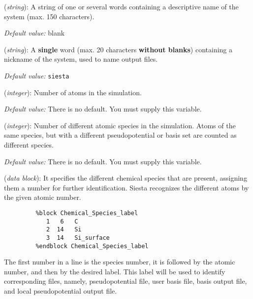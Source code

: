 \documentclass[11pt]{article}
\begin{document}
\begin{description}
\itemsep 10pt
\parsep 0pt

\item[{\bf SystemName}] ({\it string}): 
A string of one or several words containing a descriptive
name of the system (max. 150 characters). 

{\it Default value:} blank

\item[{\bf SystemLabel}] ({\it string}): 
A {\bf single} word (max. 20 characters {\bf without blanks})
containing a nickname of the system, used to name output files.

{\it Default value:} {\tt siesta}

\item[{\bf NumberOfAtoms}] ({\it integer}): 
Number of atoms in the simulation.

{\it Default value:} There is no default. You must supply this variable.


\item[{\bf NumberOfSpecies}] ({\it integer}): 
Number of different atomic species in the simulation. 
Atoms of the same species, but with a different 
pseudopotential or basis set are counted as different species.

{\it Default value:} There is no default. You must supply this variable.


\item[{\bf ChemicalSpeciesLabel}] ({\it data block}): 
It specifies the different chemical species that are present, 
assigning them a number for further identification. 
{\sc Siesta} recognizes the different atoms by the given atomic number.

\begin{verbatim}
         %block Chemical_Species_label
            1   6   C 
            2  14   Si
            3  14   Si_surface
         %endblock Chemical_Species_label
\end{verbatim}

The first number in a line is the species number, it is followed by the
atomic number, and then by the desired label. This label will be used
to identify corresponding files, namely, pseudopotential file, user basis
file, basis output file, and local pseudopotential output file.


\end{description}
\end{document}
